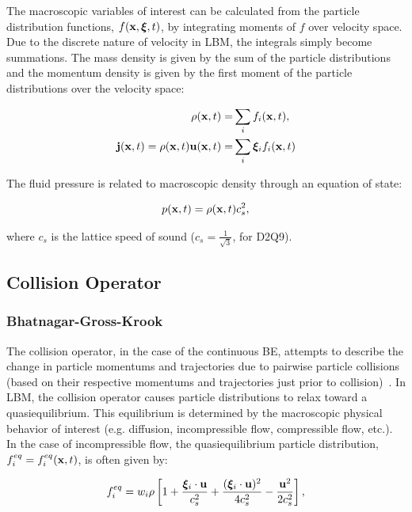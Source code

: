 The macroscopic variables of interest can be calculated from the particle distribution functions, $f(\mathbf{x}, \boldsymbol{\xi}, t)$, by integrating moments of $f$ over velocity space.
Due to the discrete nature of velocity in LBM, the integrals simply become summations.
The mass density is given by the sum of the particle distributions and the momentum density is given by the first moment of the particle distributions over the velocity space:

\begin{align}
\label{eq:rho} \rho(\mathbf{x}, t) =& \sum_{i} f_i(\mathbf{x}, t), \\
\label{eq:mom} \mathbf{j}(\mathbf{x}, t) = \rho(\mathbf{x}, t) \mathbf{u}(\mathbf{x}, t) =& \sum_{i} \boldsymbol{\xi}_i f_i(\mathbf{x}, t)
\end{align}

\noindent The fluid pressure is related to macroscopic density through an equation of state:

\begin{equation}
\label{eq:pres} p(\mathbf{x}, t) = \rho(\mathbf{x}, t) c_s^2,
\end{equation}

\noindent where $c_s$ is the lattice speed of sound ($c_s = \frac{1}{\sqrt{3}}$, for D2Q9).

\subsection{Collision Operator} \label{sec:colop}

\subsubsection{Bhatnagar-Gross-Krook} \label{sec:bgk}

The collision operator, in the case of the continuous BE, attempts to describe the change in particle momentums and trajectories due to pairwise particle collisions (based on their respective momentums and trajectories just prior to collision)~\cite{Cer90}.
In LBM, the collision operator causes particle distributions to relax toward a quasiequilibrium. 
This equilibrium is determined by the macroscopic physical behavior of interest (e.g. diffusion, incompressible flow, compressible flow, etc.).
In the case of incompressible flow, the quasiequilibrium particle distribution, $f_i^{eq} = f_i^{eq}(\mathbf{x}, t)$, is often given by:

\begin{equation} \label{eq:feq}
  f_i^{eq} = w_i \rho \left[1 + \frac{\boldsymbol{\xi}_i \cdot \mathbf{u}}{c_s^2} + \frac{(\boldsymbol{\xi}_i \cdot \mathbf{u})^2}{4c_s^2} - \frac{\mathbf{u}^2}{2c_s^2} \right],
\end{equation}

